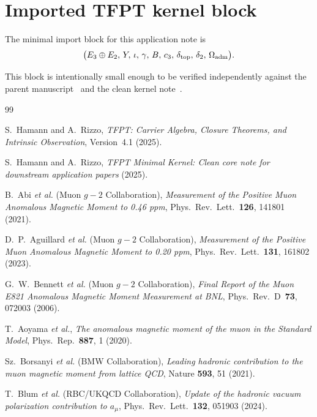 \section{Imported TFPT kernel block}\label{app:import}

The minimal import block for this application note is
\[
\bigl(
E_3\oplus E_2,\,
Y,\,
\iota,\,
\gamma,\,
B,\,
c_3,\,
\delta_{\mathrm{top}},\,
\delta_2,\,
\Omega_{\mathrm{adm}}
\bigr).
\]
\begin{sloppypar}
This block is intentionally small enough to be verified
independently against the parent manuscript~\cite{TFPT31}
and the clean kernel note~\cite{TFPTkernel}.
\end{sloppypar}

\begin{sloppypar}
\begin{thebibliography}{99}

S.~Hamann and A.~Rizzo,
\emph{TFPT: Carrier Algebra, Closure Theorems, and Intrinsic Observation},
Version~4.1 (2025).

S.~Hamann and A.~Rizzo,
\emph{TFPT Minimal Kernel: Clean core note for downstream
application papers} (2025).

B.~Abi \emph{et al.} (Muon $g-2$ Collaboration),
\emph{Measurement of the Positive Muon Anomalous Magnetic Moment to 0.46 ppm},
Phys.\ Rev.\ Lett.\ \textbf{126}, 141801 (2021).

D.~P.~Aguillard \emph{et al.} (Muon $g-2$ Collaboration),
\emph{Measurement of the Positive Muon Anomalous Magnetic Moment to 0.20 ppm},
Phys.\ Rev.\ Lett.\ \textbf{131}, 161802 (2023).

G.~W.~Bennett \emph{et al.} (Muon $g-2$ Collaboration),
\emph{Final Report of the Muon E821 Anomalous Magnetic Moment Measurement at BNL},
Phys.\ Rev.\ D~\textbf{73}, 072003 (2006).

T.~Aoyama \emph{et al.},
\emph{The anomalous magnetic moment of the muon in the Standard Model},
Phys.\ Rep.\ \textbf{887}, 1 (2020).

Sz.~Borsanyi \emph{et al.} (BMW Collaboration),
\emph{Leading hadronic contribution to the muon magnetic moment from lattice QCD},
Nature \textbf{593}, 51 (2021).

T.~Blum \emph{et al.} (RBC/UKQCD Collaboration),
\emph{Update of the hadronic vacuum polarization contribution to $a_\mu$},
Phys.\ Rev.\ Lett.\ \textbf{132}, 051903 (2024).

\end{thebibliography}
\end{sloppypar}


